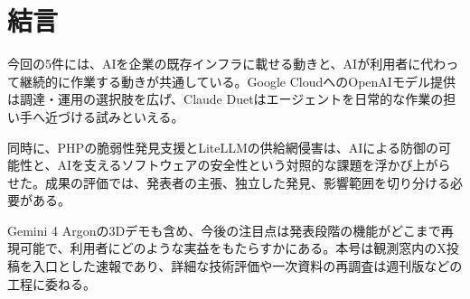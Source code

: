 \section*{結言}
今回の5件には、AIを企業の既存インフラに載せる動きと、AIが利用者に代わって継続的に作業する動きが共通している。Google CloudへのOpenAIモデル提供は調達・運用の選択肢を広げ、Claude Duetはエージェントを日常的な作業の担い手へ近づける試みといえる。

同時に、PHPの脆弱性発見支援とLiteLLMの供給網侵害は、AIによる防御の可能性と、AIを支えるソフトウェアの安全性という対照的な課題を浮かび上がらせた。成果の評価では、発表者の主張、独立した発見、影響範囲を切り分ける必要がある。

Gemini 4 Argonの3Dデモも含め、今後の注目点は発表段階の機能がどこまで再現可能で、利用者にどのような実益をもたらすかにある。本号は観測窓内のX投稿を入口とした速報であり、詳細な技術評価や一次資料の再調査は週刊版などの工程に委ねる。
